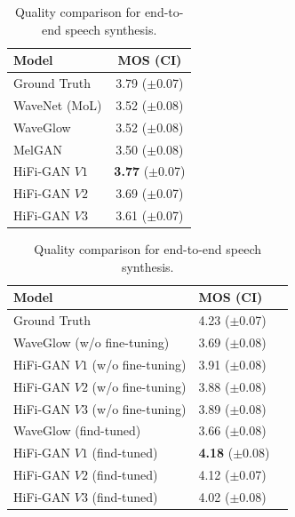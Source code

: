 \begin{table}[h]
  \centering
    \begin{minipage}[t]{.41\linewidth}
      \centering
      \protect\caption{Quality comparison of synthesized utterances for unseen speakers.}
      \label{tab:speaker-generalization}
      \begin{tabular}[htbp]{lc}
        \toprule
        Model\hspace{2.0cm}   & \hspace{0.5cm}MOS (CI)\hspace{0cm} \\
        \midrule
        Ground Truth    & 3.79 ($\pm$0.07) \\
        \midrule 
        WaveNet (MoL)   & 3.52 ($\pm$0.08) \\
        WaveGlow        & 3.52 ($\pm$0.08) \\
        MelGAN          & 3.50  ($\pm$0.08) \\
        \midrule 
        HiFi-GAN $V1$ & \textbf{3.77} ($\pm$0.07) \\
        HiFi-GAN $V2$ & 3.69 ($\pm$0.07) \\
        HiFi-GAN $V3$ & 3.61 ($\pm$0.07) \\
        \bottomrule
      \end{tabular}
    \end{minipage} 
    \hspace{0.5cm}
    \begin{minipage}[t]{.53\linewidth}
      \centering
      \protect\caption{Quality comparison for end-to-end speech synthesis.}
      \label{tab:end-to-end-speech-synthesis}
      \begin{tabular}[htbp]{llc}
        \toprule
        Model\hspace{3.7cm}   & \hspace{0.5cm}MOS (CI)\hspace{0cm} \\
        \midrule
        Ground Truth        & 4.23 ($\pm$0.07) \\
        \midrule[0.8pt]
        WaveGlow (w/o fine-tuning)   & 3.69 ($\pm$0.08) \\
        \midrule 
         HiFi-GAN $V1$ (w/o fine-tuning)    & 3.91 ($\pm$0.08) \\
         HiFi-GAN $V2$ (w/o fine-tuning)    & 3.88 ($\pm$0.08) \\
         HiFi-GAN $V3$ (w/o fine-tuning)    & 3.89 ($\pm$0.08) \\
        \midrule 
        WaveGlow (find-tuned)    & 3.66 ($\pm$0.08) \\
        \midrule 
        HiFi-GAN $V1$ (find-tuned)    & \textbf{4.18} ($\pm$0.08) \\
        HiFi-GAN $V2$ (find-tuned)    & 4.12 ($\pm$0.07) \\
        HiFi-GAN $V3$ (find-tuned)    & 4.02 ($\pm$0.08) \\
        \bottomrule
      \end{tabular}
    \end{minipage}
\end{table}

